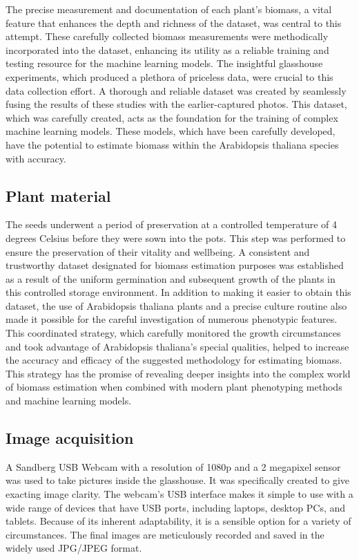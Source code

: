 \documentclass[a4paper,11pt]{report}%
\renewcommand{\\}{\vspace*{0.5\baselineskip} \newline}
\begin{document}
\noindent The precise measurement and documentation of each plant's biomass, a vital feature that enhances the depth and richness of the dataset, was central to this attempt. These carefully collected biomass measurements were methodically incorporated into the dataset, enhancing its utility as a reliable training and testing resource for the machine learning models. 
The insightful glasshouse experiments, which produced a plethora of priceless data, were crucial to this data collection effort. A thorough and reliable dataset was created by seamlessly fusing the results of these studies with the earlier-captured photos. This dataset, which was carefully created, acts as the foundation for the training of complex machine learning models. These models, which have been carefully developed, have the potential to estimate biomass within the Arabidopsis thaliana species with accuracy.



\subsection{Plant material}
The seeds underwent a period of preservation at a controlled temperature of 4 degrees Celsius before they were sown into the pots. This step was performed to ensure the preservation of their vitality and wellbeing. A consistent and trustworthy dataset designated for biomass estimation purposes was established as a result of the uniform germination and subsequent growth of the plants in this controlled storage environment. In addition to making it easier to obtain this dataset, the use of Arabidopsis thaliana plants and a precise culture routine also made it possible for the careful investigation of numerous phenotypic features.
This coordinated strategy, which carefully monitored the growth circumstances and took advantage of Arabidopsis thaliana's special qualities, helped to increase the accuracy and efficacy of the suggested methodology for estimating biomass. This strategy has the promise of revealing deeper insights into the complex world of biomass estimation when combined with modern plant phenotyping methods and machine learning models.



\subsection{Image acquisition}
A Sandberg USB Webcam with a resolution of 1080p and a 2 megapixel sensor was used to take pictures inside the glasshouse. It was specifically created to give exacting image clarity. The webcam's USB interface makes it simple to use with a wide range of devices that have USB ports, including laptops, desktop PCs, and tablets. Because of its inherent adaptability, it is a sensible option for a variety of circumstances. The final images are meticulously recorded and saved in the widely used JPG/JPEG format.
\end{document}
